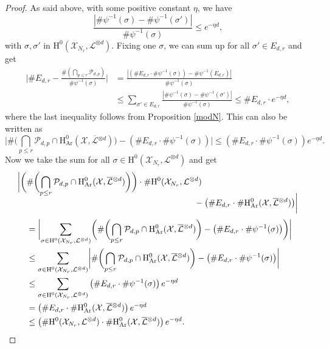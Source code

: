\documentclass[JEP,XML,SOM,Unicode,published]{cedram}
\theoremstyle{plain}
\theoremstyle{definition}
\newcommand{\ho}{\mathrm{H}}
\newcommand{\X}{\mathcal{X}}
\newcommand{\Li}{\overline{\mathcal{L}}{}}
\newcommand{\li}{\mathcal{L}}
\begin{document}
\begin{proof}
As said above, with some positive constant $\eta$, we have
\[
\frac{| \#\psi^{-1}(\sigma)- \#\psi^{-1}(\sigma') |}{\#\psi^{-1}(\sigma)}\leq e^{-\eta d},
\]
with $\sigma,\sigma'$ in $ \ho^0(\X_{N_r},\li^{\otimes d})$. Fixing one $\sigma$, we can sum up for all $\sigma'\in E_{d,r}$ and get
\begin{align*}
\biggl| \#E_{d,r}-\frac{\#(\bigcap_{p\leq r}\mathcal{P}_{d,p})}{\#\psi^{-1}(\sigma)} \biggr| &=\frac{| \left(\#E_{d,r}\cdot \#\psi^{-1}(\sigma)\right)- \#\psi^{-1}(E_{d,r}) |}{\#\psi^{-1}(\sigma)} \\
&\leq \sum_{\sigma'\in E_{d,r}}\frac{| \#\psi^{-1}(\sigma)- \#\psi^{-1}(\sigma') |}{\#\psi^{-1}(\sigma)} \leq \#E_{d,r}\cdot e^{-\eta d},
\end{align*}
where the last inequality follows from Proposition \ref{modN}. This can also be written as
\[
\biggl| \#\biggl(\bigcap_{p\leq r}\mathcal{P}_{d,p}\cap \ho^0_{\mathrm{Ar}}(\X, \overline{\mathcal{L}}{}^{\otimes d})\biggr)-\left(\#E_{d,r}\cdot\#\psi^{-1}(\sigma)\right) \biggr|\leq \left(\#E_{d,r}\cdot\#\psi^{-1}(\sigma)\right) e^{-\eta d}.
\]
Now we take the sum for all $\sigma \in \ho^0(\X_{N_r}, \li^{\otimes d})$ and get
\begin{align*}
\biggl| \biggl(&\#\biggl(\bigcap_{p\leq r}\mathcal{P}_{d,p}\cap \ho^0_{\mathrm{Ar}}(\X, \Li^{\otimes d})\biggr)\biggr)\cdot \#\ho^0(\X_{N_r}, \li^{\otimes d})\\[-8pt]
&\hspace*{6.95cm}-\left(\#E_{d,r}\cdot\#\ho^0_{\mathrm{Ar}}(\X, \Li^{\otimes d})\right) \biggr| \\[3pt]
&= \biggl| \sum_{\sigma \in \ho^0(\X_{N_r}, \li^{\otimes d})}\biggl(\#\biggl(\bigcap_{p\leq r}\mathcal{P}_{d,p}\cap \ho^0_{\mathrm{Ar}}(\X, \Li^{\otimes d})\biggr)-\left(\#E_{d,r}\cdot\#\psi^{-1}(\sigma)\right) \biggr)\biggr| \\
&\leq \sum_{\sigma \in \ho^0(\X_{N_r}, \li^{\otimes d})}\biggl| \#\biggl(\bigcap_{p\leq r}\mathcal{P}_{d,p}\cap \ho^0_{\mathrm{Ar}}(\X, \Li^{\otimes d}) \biggr)-\left(\#E_{d,r}\cdot\#\psi^{-1}(\sigma)\right) \biggr| \\
&\leq \sum_{\sigma \in \ho^0(\X_{N_r}, \li^{\otimes d})}\left(\#E_{d,r}\cdot\#\psi^{-1}(\sigma)\right) e^{-\eta d}\\
&= \left(\#E_{d,r}\cdot\#\ho^0_{\mathrm{Ar}}(\X, \Li^{\otimes d})\right) e^{-\eta d} \\
&\leq \left(\#\ho^0(\X_{N_r}, \li^{\otimes d})\cdot\#\ho^0_{\mathrm{Ar}}(\X, \Li^{\otimes d})\right) e^{-\eta d}.
\end{align*}

\end{proof}
\end{document}
